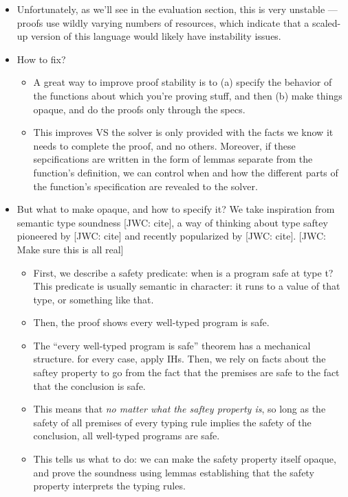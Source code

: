 \documentclass[sigplan,review,screen,anonymous]{acmart}
\newcommand{\comm}[3]{\textcolor{#1}{[#2: #3]}}
\newcommand{\jwc}[1]{\comm{dkgreen}{JWC}{#1}}
\begin{document}
\begin{itemize}
  \item Unfortunately, as we'll see in the evaluation section, this is very unstable --- proofs use wildly varying numbers of resources,
  which indicate that a scaled-up version of this language would likely have instability issues.
  \item How to fix?
  \begin{itemize}
    \item A great way to improve proof stability is to (a) specify the behavior of the functions about which you're proving stuff, and then (b) make things opaque, and do the proofs only through the specs.
    \item This improves VS the solver is only provided with the facts we know it needs to complete the proof, and no others.
        Moreover, if these sepcifications are written in the form of lemmas separate from the function's definition, we can control when and how
        the different parts of the function's specification are revealed to the solver.
  \end{itemize}
  \item But what to make opaque, and how to specify it? We take inspiration from semantic type soundness \jwc{cite}, a way of thinking about type saftey pioneered by \jwc{cite}
        and recently popularized by \jwc{cite}. \jwc{Make sure this is all real}
      \begin{itemize}
        \item First, we describe a safety predicate: when is a program safe at type t? This predicate is usually semantic in character: it runs to a value of that type, or something like that.
        \item Then, the proof shows every well-typed program is safe.
        \item The ``every well-typed program is safe'' theorem has a mechanical
        structure. for every case, apply IHs. Then, we rely on facts about the
        saftey property to go from the fact that the premises are safe to the
        fact that the conclusion is safe.
        \item This means that \emph{no matter what the saftey property is}, so long as the safety of all premises of every
        typing rule implies the safety of the conclusion, all well-typed
        programs are safe.
        \item This tells us what to do: we can make the safety property itself
        opaque, and prove the soundness using lemmas establishing that the
        safety property interprets the typing rules.
      \end{itemize}
\end{itemize}
\end{document}
